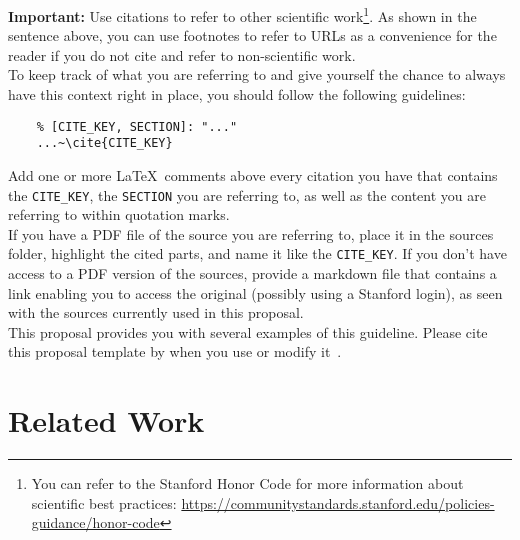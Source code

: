 \documentclass[
	pdftex,
	letterpaper,
	titlepage,
	final,
	oneside,
	11pt,
	DIV=calc,
]{scrbook}
\begin{document}
\begin{tcolorbox}[breakable]
	\textbf{Important:} Use citations to refer to other scientific work\footnote{You can refer to the Stanford Honor Code for more information about scientific best practices: \url{https://communitystandards.stanford.edu/policies-guidance/honor-code}}.
	As shown in the sentence above, you can use footnotes to refer to URLs as a convenience for the reader if you do not cite and refer to non-scientific work.
	\\
	To keep track of what you are referring to and give yourself the chance to always have this context right in place, you should follow the following guidelines:
	\begin{verbatim}
	% [CITE_KEY, SECTION]: "..."
	...~\cite{CITE_KEY}
	\end{verbatim}
	Add one or more \LaTeX~comments above every citation you have that contains the \texttt{CITE\_KEY}, the \texttt{SECTION} you are referring to, as well as the content you are referring to within quotation marks.
	\\
	If you have a PDF file of the source you are referring to, place it in the sources folder, highlight the cited parts, and name it like the \texttt{CITE\_KEY}.
	If you don't have access to a PDF version of the sources, provide a markdown file that contains a link enabling you to access the original (possibly using a Stanford login), as seen with the sources currently used in this proposal.
	\\
	This proposal provides you with several examples of this guideline.
	Please cite this proposal template by \citeauthor{schmiedmayer2023proposal} when you use or modify it~\cite{schmiedmayer2023proposal}.
\end{tcolorbox}


\section*{Related Work}
\end{document}

